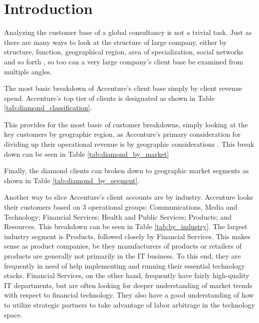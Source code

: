 \section{Introduction}

Analyzing the customer base of a global consultancy is not a trivial task. Just as there are many ways to look at the structure of large company, either by structure, function, geographical region, area of specialization, social networks and so forth \parencite{soderstromOrganizationalStructureInteraction2020}, so too can a very large company's client base be examined from multiple angles.



The most basic breakdown of Accenture's client base simply by client revenue spend. Accenture's top tier of clients is designated as shown in Table \ref{tab:diamond_classification}.

This provides for the most basic of customer breakdowns, simply looking at the key customers by geographic region, as Accenture's primary consideration for dividing up their operational revenue is by geographic considerations \parencite{AccenturePLC2019}. This break down can be seen in Table \ref{tab:diamond_by_market}

Finally, the diamond clients can broken down to geographic market segments as shown in Table \ref{tab:diamond_by_segment}.

Another way to slice Accenture's client accounts are by industry. Accenture looks their customers based on 3 operational groups: Communications, Media and Technology; Financial Services; Health and Public Services; Products; and Resources. This breakdown can be seen in Table \ref{tab:by_industry}. The largest industry segment is Products, followed closely by Financial Services. This makes sense as product companies, be they manufacturers of products or retailers of products are generally not primarily in the IT business. To this end, they are frequently in need of help implementing and running their essential technology stacks. Financial Services, on the other hand, frequently have fairly high-quality IT departments, but are often looking for deeper understanding of market trends with respect to financial technology. They also have a good understanding of how to utilize strategic partners to take advantage of labor arbitrage in the technology space.
